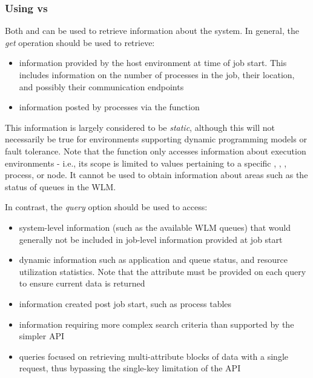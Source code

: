 \subsubsection{Using  vs }
\label{chap:api_job_mgmt:query}

Both  and  can be used to retrieve information about the system. In general, the \emph{get} operation should be used to retrieve:

\begin{itemize}
\item information provided by the host environment at time of job start. This includes information on the number of processes in the job, their location, and possibly their communication endpoints
\item information posted by processes via the  function
\end{itemize}

This information is largely considered to be \emph{static}, although this will not necessarily be true for environments supporting dynamic programming models or fault tolerance. Note that the  function only accesses information about execution environments - i.e., its scope is limited to values pertaining to a specific , , , process, or node. It cannot be used to obtain information about areas such as the status of queues in the \ac{WLM}.

In contrast, the \emph{query} option should be used to access:

\begin{itemize}
\item system-level information (such as the available \ac{WLM} queues) that would generally not be included in job-level information provided at job start
\item dynamic information such as application and queue status, and resource utilization statistics. Note that the  attribute must be provided on each query to ensure current data is returned
\item information created post job start, such as process tables
\item information requiring more complex search criteria than supported by the simpler  \ac{API}
\item queries focused on retrieving multi-attribute blocks of data with a single request, thus bypassing the single-key limitation of the  \ac{API}
\end{itemize}

